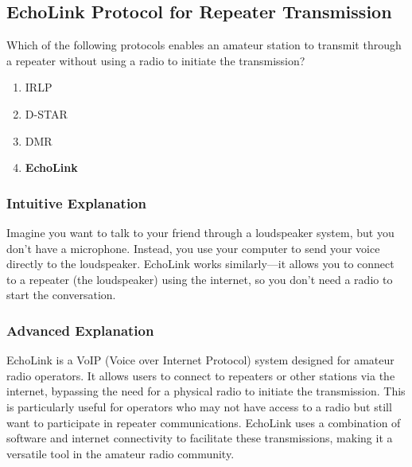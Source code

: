 \subsection{EchoLink Protocol for Repeater Transmission}
\label{T8C09}

\begin{tcolorbox}[colback=gray!10!white,colframe=black!75!black,title=T8C09]
Which of the following protocols enables an amateur station to transmit through a repeater without using a radio to initiate the transmission?
\begin{enumerate}[noitemsep]
    \item IRLP
    \item D-STAR
    \item DMR
    \item \textbf{EchoLink}
\end{enumerate}
\end{tcolorbox}

\subsubsection*{Intuitive Explanation}
Imagine you want to talk to your friend through a loudspeaker system, but you don't have a microphone. Instead, you use your computer to send your voice directly to the loudspeaker. EchoLink works similarly—it allows you to connect to a repeater (the loudspeaker) using the internet, so you don't need a radio to start the conversation.

\subsubsection*{Advanced Explanation}
EchoLink is a VoIP (Voice over Internet Protocol) system designed for amateur radio operators. It allows users to connect to repeaters or other stations via the internet, bypassing the need for a physical radio to initiate the transmission. This is particularly useful for operators who may not have access to a radio but still want to participate in repeater communications. EchoLink uses a combination of software and internet connectivity to facilitate these transmissions, making it a versatile tool in the amateur radio community.